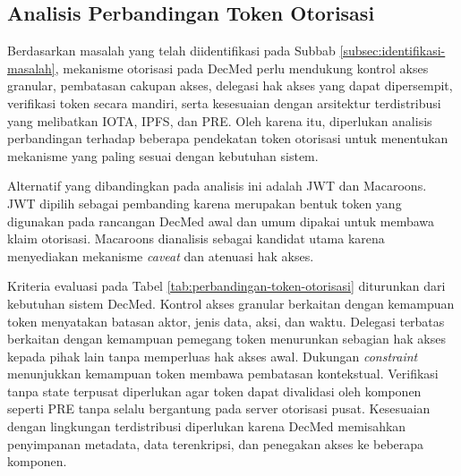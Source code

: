 \subsection{Analisis Perbandingan Token Otorisasi}
\label{subsec:analisis-penggunaan-macaroons}

Berdasarkan masalah yang telah diidentifikasi pada Subbab \ref{subsec:identifikasi-masalah}, mekanisme otorisasi pada DecMed perlu mendukung kontrol akses granular, pembatasan cakupan akses, delegasi hak akses yang dapat dipersempit, verifikasi token secara mandiri, serta kesesuaian dengan arsitektur terdistribusi yang melibatkan IOTA, IPFS, dan PRE. Oleh karena itu, diperlukan analisis perbandingan terhadap beberapa pendekatan token otorisasi untuk menentukan mekanisme yang paling sesuai dengan kebutuhan sistem.

Alternatif yang dibandingkan pada analisis ini adalah JWT dan Macaroons. JWT dipilih sebagai pembanding karena merupakan bentuk token yang digunakan pada rancangan DecMed awal dan umum dipakai untuk membawa klaim otorisasi. Macaroons dianalisis sebagai kandidat utama karena menyediakan mekanisme \textit{caveat} dan atenuasi hak akses.

Kriteria evaluasi pada Tabel \ref{tab:perbandingan-token-otorisasi} diturunkan dari kebutuhan sistem DecMed. Kontrol akses granular berkaitan dengan kemampuan token menyatakan batasan aktor, jenis data, aksi, dan waktu. Delegasi terbatas berkaitan dengan kemampuan pemegang token menurunkan sebagian hak akses kepada pihak lain tanpa memperluas hak akses awal. Dukungan \textit{constraint} menunjukkan kemampuan token membawa pembatasan kontekstual. Verifikasi tanpa state terpusat diperlukan agar token dapat divalidasi oleh komponen seperti PRE tanpa selalu bergantung pada server otorisasi pusat. Kesesuaian dengan lingkungan terdistribusi diperlukan karena DecMed memisahkan penyimpanan metadata, data terenkripsi, dan penegakan akses ke beberapa komponen.

